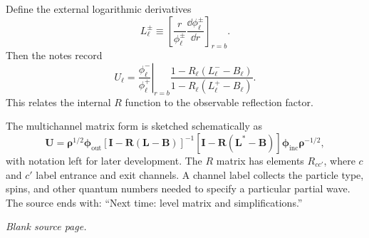 Define the external logarithmic derivatives
\[
  L_\ell^\pm
  \equiv\left[
  \frac{r}{\phi_\ell^\pm}
  \frac{\dd\phi_\ell^\pm}{\dd r}
  \right]_{r=b}.
\]
Then the notes record
\begin{equation*}
  U_\ell
  =\left.\frac{\phi_\ell^-}{\phi_\ell^+}\right|_{r=b}
  \frac{1-R_\ell(L_\ell^- -B_\ell)}
  {1-R_\ell(L_\ell^+ -B_\ell)}.
  \tag{33}
\end{equation*}
This relates the internal $R$ function to the observable reflection factor.

The multichannel matrix form is sketched schematically as
\[
  \bm U
  =\bm\rho^{1/2}\bm\phi_{\mathrm{out}}
  [\bm I-\bm R(\bm L-\bm B)]^{-1}
  [\bm I-\bm R(\bm L^*-\bm B)]
  \bm\phi_{\mathrm{inc}}\bm\rho^{-1/2},
\]
with notation left for later development.  The $R$ matrix has elements $R_{cc'}$, where $c$ and $c'$ label entrance and exit channels.  A channel label collects the particle type, spins, and other quantum numbers needed to specify a particular partial wave.  The source ends with: ``Next time: level matrix and simplifications.''

\textit{Blank source page.}
